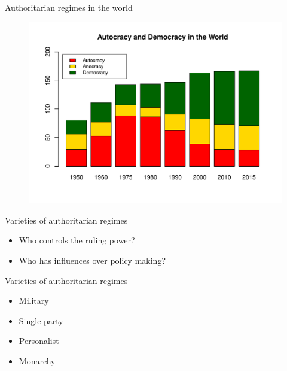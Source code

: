 \documentclass[10pt]{beamer}
\begin{document}
\begin{frame}{Authoritarian regimes in the world}
	\begin{figure}
	\centering
	\includegraphics[scale=0.6]{Figs/Polity/pl_history}
	\end{figure}
\end{frame}

\begin{frame}{Varieties of authoritarian regimes}
	\begin{itemize}
		\item Who controls the ruling power?
		\item Who has influences over policy making?
	\end{itemize}
\end{frame}

\begin{frame}{Varieties of authoritarian regimes}
	\begin{itemize}
		\item Military
		\item Single-party
		\item Personalist
		\item Monarchy
	\end{itemize}
\end{frame}
\end{document}
